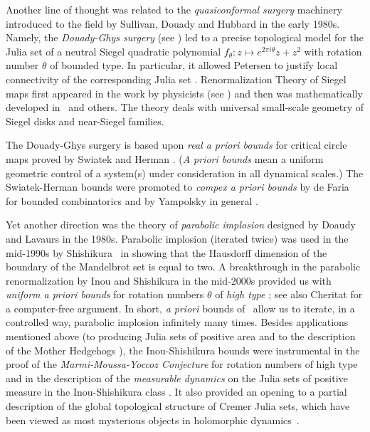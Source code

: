 \documentclass{amsart}
\newcommand{\1}{{\mathbb 1 }}
\theoremstyle{remark}
\numberwithin{equation}{section}
\theoremstyle{definition}
\begin{document}
 


Another line of thought was related to the {\em quasiconformal surgery}  machinery
introduced to the field by Sullivan, Douady and Hubbard in the early 1980s.
Namely, the {\em Douady-Ghys surgery} (see \cite{D-Siegel}) led  to a precise topological model for the Julia set of a neutral Siegel quadratic
polynomial $f_\theta: z\mapsto e^{2\pi i \theta} z+ z^2$ with rotation number $\theta$ of bounded type.  In particular, it allowed Petersen to justify local connectivity of
the corresponding Julia set \cite{Pe}. Renormalization Theory of Siegel  maps first appeared in the work by physicists (see \cite{Wi, MN,MP}) and then was mathematically developed in~\cite{McM1,Ya-posmeas, DLS, DL} and others. The theory deals with universal small-scale geometry of Siegel disks and near-Siegel families.



The Douady-Ghys surgery is based upon {\em real a priori bounds} for
critical circle maps proved by Swiatek \cite{Sw} and Herman \cite{H}.
 ({\em A priori bounds} mean a uniform geometric control of a
 system(s) under consideration in all dynamical scales.) 
 The Swiatek-Herman  bounds were promoted to {\em compex a priori bounds}
 by de Faria for bounded combinatorics \cite{dF} and by Yampolsky in general  
\cite{Ya}. 
 
Yet another direction was the theory of {\em parabolic implosion} designed by Doaudy and Lavaurs in the 1980s. Parabolic implosion (iterated twice) was used in the mid-1990s by Shishikura~\cite{Sh} in showing that the Hausdorff dimension of the boundary of the Mandelbrot set is equal to two.  A breakthrough in the parabolic renormalization by Inou and Shishikura in the mid-2000s provided us with {\em uniform a priori bounds} for rotation numbers $\theta$ of {\em high type} \cite{IS}; see also Cheritat \cite{Che:nearpar} for a computer-free argument. In short, \emph{a priori} bounds of~\cite{IS} allow us to iterate, in a controlled way, parabolic implosion infinitely many times.  Besides applications mentioned above (to producing Julia sets of
positive area \cite{BC,AL-posmeas} and to the description of the Mother
Hedgehogs \cite{ShY,Ch2}), the
Inou-Shishikura bounds were instrumental in the
proof of the \emph{Marmi-Moussa-Yoccoz Conjecture} for rotation numbers of high type  \cite{ChC} and in the description of the \emph{measurable dynamics} on the Julia sets of positive measure in the Inou-Shishikura class \cite{Ch1,ACh}. It also provided an opening to a partial description of the global topological structure of Cremer Julia sets, which have been viewed as most mysterious objects in holomorphic dynamics~\cite{BBCO}.
\end{document}
